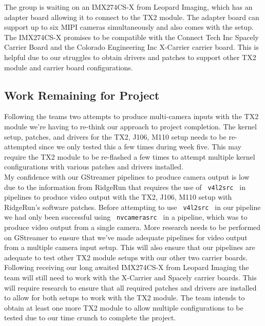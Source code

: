 \documentclass[letterpaper,10pt,serif,draftclsnofoot,onecolumn,compsoc,titlepage]{IEEEtran}
\begin{document}
The group is waiting on an IMX274CS-X from Leopard Imaging, which has an 
adapter board allowing it to connect to the TX2 module. The adapter board can support 
up to six MIPI cameras simultaneously and also comes with the setup. The IMX274CS-X 
promises to be compatible with the Connect Tech Inc Spacely Carrier
Board and the Colorado Engineering Inc X-Carrier carrier board. This is helpful due to 
our struggles to obtain drivers and patches to support other TX2 module and carrier 
board configurations. \\


\subsection{Work Remaining for Project}

Following the teams two attempts to produce multi-camera inputs with the TX2 module 
we're having to re-think our approach to project completion. The kernel setup, patches, 
and drivers for the TX2, J106, M110 setup needs to be re-attempted since we only tested 
this a few times during week five. This may require the TX2 module to be re-flashed a 
few times to attempt multiple kernel configurations with various patches and drivers 
installed. \\

My confidence with our GStreamer pipelines to produce camera output is 
low due to the information from RidgeRun that requires the use of 
\texttt{ v4l2src } in pipelines to produce video output with the TX2, J106, M110 setup with 
RidgeRun's software patches. 
Before attempting to use \texttt{ v4l2src } in our pipeline we had only been successful 
using \texttt{ nvcamerasrc } in a pipeline, which was to produce video output from a 
single camera. More research needs to be performed on GStreamer to ensure that we've 
made adequate pipelines for video output from a multiple camera input setup. This will 
also ensure that our pipelines are adequate to test other TX2 module setups with our 
other two carrier boards. \\

Following receiving our long awaited IMX274CS-X from Leopard Imaging the team will 
still need to work with the X-Carrier and Spacely carrier boards. This will 
require research to ensure that all required patches and drivers are installed 
to allow for both setups to work with the TX2 module. The team intends to obtain at 
least one more TX2 module to allow multiple configurations to be tested due to our 
time crunch to complete the project. \\
\end{document}
